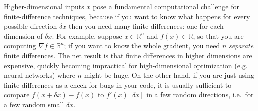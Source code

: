 Higher-dimensional inputs  $x$ pose a fundamental computational challenge for finite-difference techniques, because if you want to know what happens for every possible direction $\delta x$ then you need many finite differences: one for each dimension of $\delta x$. For example, suppose $x \in \mathbb{R}^n$ and $f(x) \in \mathbb{R}$, so that you are computing $\nabla f \in \mathbb{R}^n$; if you want to know the whole gradient, you need $n$ \emph{separate} finite differences.
The net result is that finite differences in higher dimensions are expensive, quickly becoming impractical for high-dimensional optimization (e.g. neural networks) where $n$  might be huge.  On the other hand, if you are just using finite differences as a check for bugs in your code, it is usually sufficient to compare $f(x+\delta x) - f(x)$ to $f'(x)[\delta x]$ in a few random directions, i.e.~for a few random small $\delta x$.